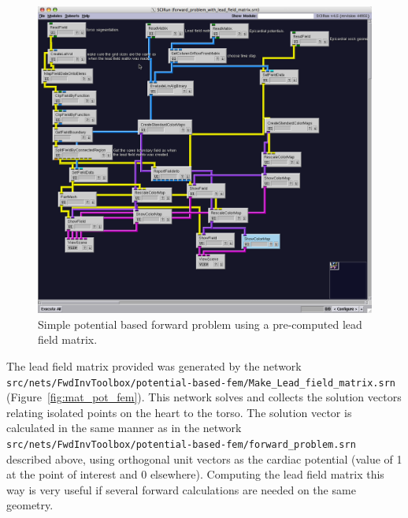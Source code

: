 \documentclass[fleqn,11pt,openany]{book}
\begin{document}
\begin{figure}[H]
\begin{center}
\includegraphics[width=\textwidth]{ECGToolkitGuide_figures/potential_forward_fem_with_leadfield.png}
\caption{Simple potential based forward problem using a pre-computed lead field matrix.}
\label{fig:pot_for_fem_w_mat}
\end{center}
\end{figure}

The lead field matrix provided was generated by the network \newline
{\tt src/nets/FwdInvToolbox/potential-based-fem/Make\_Lead\_field\_matrix.srn} (Figure~\ref{fig:mat_pot_fem}).
This network solves and collects the solution vectors relating isolated points on the heart to the torso. The solution vector is calculated in the same manner as in the network \newline
{\tt src/nets/FwdInvToolbox/potential-based-fem/forward\_problem.srn} described above, using orthogonal unit vectors as the cardiac potential (value of 1 at the point of interest and 0 elsewhere). Computing the lead field matrix this way is very useful if several forward calculations are needed on the same geometry.
\end{document}
